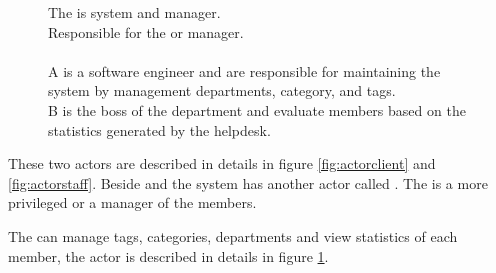 \begin{figure}[h]
\begin{sadlistar}{\admin[c]}
 The \admin[] is system and \astaff[] manager. \\
 Responsible for the \hdesk[] or \astaff[] manager. \\
\\ \admin[c] A is a software engineer and are responsible for maintaining the system by management departments, category, and tags. \\
\admin[c] B is the boss of the department and evaluate \astaff[] members based on the statistics generated by the helpdesk.
 \end{sadlistar}
 \caption{}
 \label{fig:actoradmin}
 \end{figure}


These two actors are described in details in figure \ref{fig:actorclient} and \ref{fig:actorstaff}. 
Beside \astaff{} and \aclient{} the system has another actor called \sadmin{}. 
The \sadmin{} is a more privileged \astaff{} or a manager of the \astaff members. 

The \sadmin{} can manage tags, categories, departments and view statistics of each \astaff [] member, the actor \admin[] is described in details in figure \ref{fig:actoradmin}.
